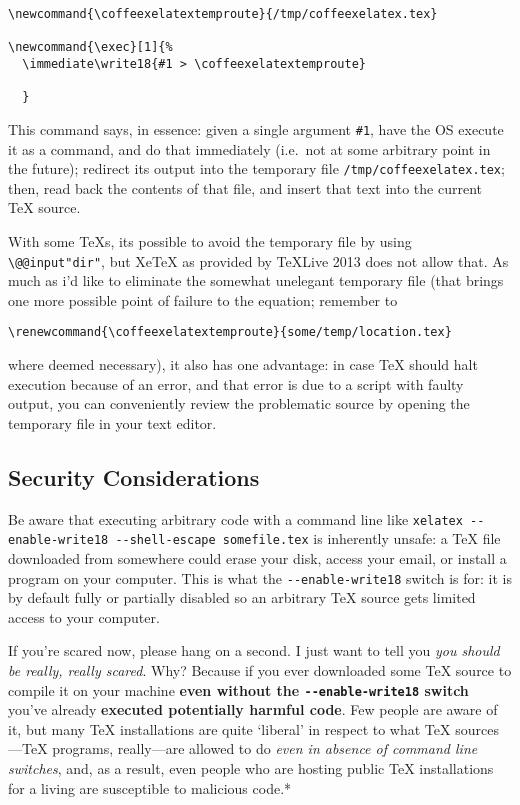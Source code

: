 \begin{verbatim}
\newcommand{\coffeexelatextemproute}{/tmp/coffeexelatex.tex}

\newcommand{\exec}[1]{%
  \immediate\write18{#1 > \coffeexelatextemproute}
  
  }
\end{verbatim}

This command says, in essence: given a single argument \texttt{\#1},
have the OS execute it as a command, and do that immediately (i.e.~not
at some arbitrary point in the future); redirect its output into the
temporary file \texttt{/tmp/coffeexelatex.tex}; then, read back the
contents of that file, and insert that text into the current TeX source.

With some TeXs, its possible to avoid the temporary file by using
\texttt{\textbackslash{}@@input\textbar{}"dir"}, but XeTeX as provided
by TeXLive 2013 does not allow that. As much as i'd like to eliminate
the somewhat unelegant temporary file (that brings one more possible
point of failure to the equation; remember to

\begin{verbatim}
\renewcommand{\coffeexelatextemproute}{some/temp/location.tex}
\end{verbatim}

where deemed necessary), it also has one advantage: in case TeX should
halt execution because of an error, and that error is due to a script
with faulty output, you can conveniently review the problematic source
by opening the temporary file in your text editor.

\subsection{Security Considerations}\label{security-considerations}

Be aware that executing arbitrary code with a command line like
\texttt{xelatex -{}-enable-write18 -{}-shell-escape somefile.tex} is
inherently unsafe: a TeX file downloaded from somewhere could erase your
disk, access your email, or install a program on your computer. This is
what the \texttt{-{}-enable-write18} switch is for: it is by default
fully or partially disabled so an arbitrary TeX source gets limited
access to your computer.

If you're scared now, please hang on a second. I just want to tell you
\emph{you should be really, really scared}. Why? Because if you ever
downloaded some TeX source to compile it on your machine \textbf{even
without the \texttt{-{}-enable-write18} switch} you've already
\textbf{executed potentially harmful code}. Few people are aware of it,
but many TeX installations are quite `liberal' in respect to what TeX
sources---TeX programs, really---are allowed to do \emph{even in absence
of command line switches}, and, as a result, even people who are hosting
public TeX installations for a living are susceptible to malicious
code.*

